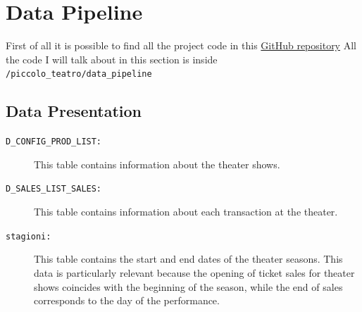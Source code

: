 \documentclass[a4paper,12pt]{report}  %
\begin{document}
\section{Data Pipeline}
  First of all it is possible to find all the project code in this \href{https://github.com/SiniscalchiCarlo/piccolo_teatro/tree/features/refactoring}{GitHub repository}
  All the code I will talk about in this section is inside \verb|/piccolo_teatro/data_pipeline|
  \subsection{Data Presentation}
    \begin{description}
      \item[\texttt{D\_CONFIG\_PROD\_LIST:}] 
        This table contains information about the theater shows.
      \item[\texttt{D\_SALES\_LIST\_SALES:}] 
        This table contains information about each transaction at the theater.
      \item[\texttt{stagioni:}] 
        This table contains the start and end dates of the theater seasons. This data is particularly relevant because the opening of ticket sales for theater shows coincides with the beginning of the season, while the end of sales corresponds to the day of the performance.
    \end{description}
\end{document}
